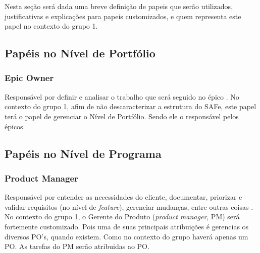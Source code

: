 Nesta seção será dada uma breve definição de papeis que serão utilizados, justificativas e explicações para papeis customizados, e quem representa este papel no contexto do grupo 1.

\subsection{Papéis no Nível de Portfólio}
\subsubsection{Epic Owner}
Responsável por definir e analisar o trabalho que será seguido no épico \cite[p. 418-419]{safe001}. No contexto do grupo 1, afim de não descaracterizar a estrutura do SAFe, este papel terá o papel de gerenciar o Nível de Portfólio. Sendo ele o responsável pelos épicos.


\subsection{Papéis no Nível de Programa}

\subsubsection{Product Manager}
Responsável por entender as necessidades do cliente, documentar, priorizar e validar requisitos (no nível de \emph{feature}), gerenciar mudanças, entre outras coisas \cite[p. 283-287]{safe001}. No contexto do grupo 1, o Gerente do Produto (\emph{product manager}, PM) será fortemente customizado. Pois uma de suas principais atribuições é gerencias os diversos PO's, quando existem. Como no contexto do grupo haverá apenas um PO. As tarefas do PM serão atribuidas ao PO. %

